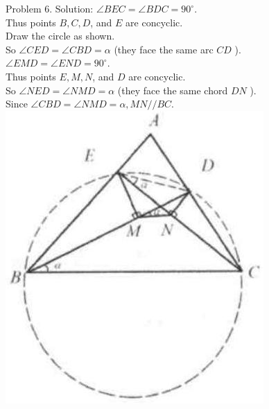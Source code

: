 \documentclass[10pt]{article}
\begin{document}
Problem 6. Solution:
\(\angle B E C=\angle B D C=90^{\circ}\).\\
Thus points \(B, C, D\), and \(E\) are concyclic.\\
Draw the circle as shown.\\
So \(\angle C E D=\angle C B D=\alpha\) (they face the same arc \(C D\) ).\\
\(\angle E M D=\angle E N D=90^{\circ}\).\\
Thus points \(E, M, N\), and \(D\) are concyclic.\\
So \(\angle N E D=\angle N M D=\alpha\) (they face the same chord \(D N\) ).\\
Since \(\angle C B D=\angle N M D=\alpha, M N / / B C\).\\
\includegraphics[max width=\textwidth, center]{2025_04_17_97bc1f7e44d93c271a88g-210(2)}
\end{document}
